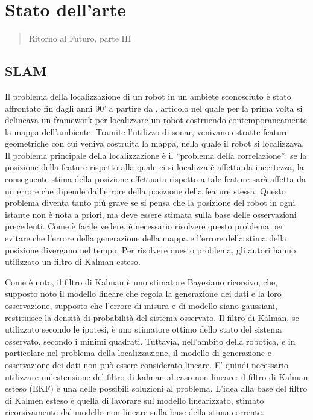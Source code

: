 \chapter{Stato dell'arte}
\label{capitolo2}
\thispagestyle{empty}

\begin{quotation}
{\footnotesize
{}
\begin{flushright}
Ritorno al Futuro, parte III
\end{flushright}
}
\end{quotation}
\vspace{0.5cm}

\section{SLAM}

Il problema della localizzazione di un robot in un ambiete sconosciuto è stato affrontato fin dagli anni 90' a partire da \cite{174711}, articolo nel quale per la prima volta si delineava un framework per localizzare un robot costruendo contemporaneamente la mappa dell'ambiente.
Tramite l'utilizzo di sonar, venivano estratte feature geometriche con cui veniva costruita la mappa, nella quale il robot si localizzava. 
Il problema principale della localizzazione è il ``problema della correlazione'': se la posizione della feature rispetto alla quale ci si localizza è affetta da incertezza, la conseguente stima della posizione effettuata rispetto a tale feature sarà affetta da un errore che dipende dall'errore della posizione della feature stessa. 
Questo problema diventa tanto più grave se si pensa che la posizione del robot in ogni istante non è nota a priori, ma deve essere stimata sulla base delle osservazioni precedenti. 
Come è facile vedere, è necessario risolvere questo problema per evitare che l'errore della generazione della mappa e l'errore della stima della posizione divergano nel tempo. 
Per risolvere questo problema, gli autori hanno utilizzato un filtro di Kalman esteso.

Come è noto, il filtro di Kalman è uno stimatore Bayesiano ricorsivo, che, supposto noto il modello lineare che regola la generazione dei dati e la loro osservazione, supposto che l'errore di misura e di modello siano gaussiani, restituisce la densità di probabilità del sistema osservato. 
Il filtro di Kalman, se utilizzato secondo le ipotesi, è uno stimatore ottimo dello stato del sistema osservato, secondo i minimi quadrati.
Tuttavia, nell'ambito della robotica, e in particolare nel problema della localizzazione, il modello di generazione e osservazione dei dati non può essere considerato lineare.
E' quindi necessario utilizzare un'estensione del filtro di kalman al caso non lineare: il filtro di Kalman esteso (EKF) è una delle possibili soluzioni al problema. 
L'idea alla base del filtro di Kalmen esteso è quella di lavorare sul modello linearizzato, stimato ricorsivamente dal modello non lineare sulla base della stima corrente.

